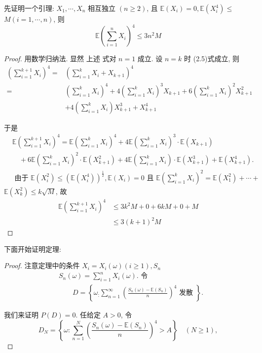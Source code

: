 {
    \small
    先证明一个引理: 
         $X_1, \cdots, X_n$ 相互独立 $(n \geq 2)$, 且 $\mathbb{E}\left(X_i\right)=0, \mathbb{E}\left(X_i^4\right) \leq$ $M(i=1, \cdots, n)$, 则
$$
\mathbb{E}\left(\sum_{i=1}^n X_i\right)^4 \leq 3 n^2 M
$$
\begin{proof}
     用数学归纳法. 显然 上述 式对 $n=1$ 成立. 设 $n=k$ 时 (2.5)式成立, 则
$$
\begin{aligned}
\left(\sum_{i=1}^{k+1} X_i\right)^4= & \left(\sum_{i=1}^k X_i+X_{k+1}\right)^4 \\
= & \left(\sum_{i=1}^k X_i\right)^4+4\left(\sum_{i=1}^k X_i\right)^3 X_{k+1}+6\left(\sum_{i=1}^k X_i\right)^2 X_{k+1}^2 \\
& +4\left(\sum_{i=1}^k X_i\right) X_{k+1}^3+X_{k+1}^4
\end{aligned}
$$

于是
$$
\begin{aligned}
& \mathbb{E}\left(\sum_{i=1}^{k+1} X_i\right)^4=\mathbb{E}\left(\sum_{i=1}^k X_i\right)^4+4 \mathbb{E}\left(\sum_{i=1}^k X_i\right)^3 \cdot \mathbb{E}\left(X_{k+1}\right) \\
& \quad+6 \mathbb{E}\left(\sum_{i=1}^k X_i\right)^2 \cdot \mathbb{E}\left(X_{k+1}^2\right)+4 \mathbb{E}\left(\sum_{i=1}^k X_i\right) \cdot \mathbb{E}\left(X_{k+1}^3\right)+\mathbb{E}\left(X_{k+1}^4\right) . \\
& \text { 由于 } \mathbb{E}\left(X_i^2\right) \leq\left(\mathbb{E}\left(X_i^4\right)\right)^{\frac{1}{2}}, \mathbb{E}\left(X_i\right)=0 \text { 且 } \mathbb{E}\left(\sum_{i=1}^k X_i\right)^2=\mathbb{E}\left(X_1^2\right)+\cdots+
\end{aligned}
$$
$\mathbb{E}\left(X_k^2\right) \leq k \sqrt{M}$, 故
$$
\begin{aligned}
\mathbb{E}\left(\sum_{i=1}^{k+1} X_i\right)^4 & \leq 3 k^2 M+0+6 k M+0+M \\
& \leq 3(k+1)^2 M
\end{aligned}
$$
\end{proof}

下面开始证明定理: 
\begin{proof}
    注意定理中的条件 $X_i=X_i(\omega)(i \geq 1), S_n$
$$
\begin{aligned}
& S_n(\omega)=\sum_{i=1}^n X_i(\omega) \text {. 令 } \\
& \qquad D=\left\{\omega_{:} \sum_{n=1}^{\infty}\left(\frac{S_n(\omega)-\mathbb{E}\left(S_n\right)}{n}\right)^4 \text { 发散 }\right\} .
\end{aligned}
$$

我们来证明 $P(D)=0$.
任给定 $A>0$, 令
$$
D_N=\left\{\omega: \sum_{n=1}^N\left(\frac{S_n(\omega)-\mathbb{E}\left(S_n\right)}{n}\right)^4>A\right\} \quad(N \geq 1),
$$


\end{proof}}
